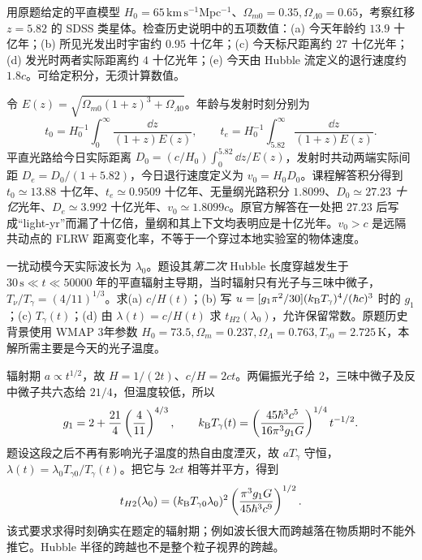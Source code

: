 \begin{exercise}
用原题给定的平直模型 $H_0=65\,\mathrm{km\,s^{-1}Mpc^{-1}}$、$\Omega_{m0}=0.35,\Omega_{\Lambda0}=0.65$，考察红移 $z=5.82$ 的 SDSS 类星体。检查历史说明中的五项数值：(a) 今天年龄约 $13.9$ 十亿年；(b) 所见光发出时宇宙约 $0.95$ 十亿年；(c) 今天标尺距离约 $27$ 十亿光年；(d) 发光时两者实际距离约 $4$ 十亿光年；(e) 今天由 Hubble 流定义的退行速度约 $1.8c$。可给定积分，无须计算数值。
\end{exercise}
\begin{solution}
令 $E(z)=\sqrt{\Omega_{m0}(1+z)^3+\Omega_{\Lambda0}}$。年龄与发射时刻分别为
\[
t_0=H_0^{-1}\int_0^\infty\frac{\dd z}{(1+z)E(z)},\qquad
t_e=H_0^{-1}\int_{5.82}^\infty\frac{\dd z}{(1+z)E(z)}.
\]
平直光路给今日实际距离 $D_0=(c/H_0)\int_0^{5.82}\dd z/E(z)$，发射时共动两端实际间距 $D_e=D_0/(1+5.82)$，今日退行速度定义为 $v_0=H_0D_0$。课程解答积分得到 $t_0\simeq13.88$ 十亿年、$t_e\simeq0.9509$ 十亿年、无量纲光路积分 $1.8099$、$D_0\simeq27.23$ \emph{十亿}光年、$D_e\simeq3.992$ 十亿光年、$v_0\simeq1.8099c$。原官方解答在一处把 $27.23$ 后写成“light-yr”而漏了十亿倍，量纲和其上下文均表明应是十亿光年。$v_0>c$ 是远隔共动点的 FLRW 距离变化率，不等于一个穿过本地实验室的物体速度。
\end{solution}

\begin{exercise}
一扰动模今天实际波长为 $\lambda_0$。题设其\emph{第二次} Hubble 长度穿越发生于 $30\,\mathrm s\ll t\ll50000$ 年的平直辐射主导期，当时辐射只有光子与三味中微子，$T_\nu/T_\gamma=(4/11)^{1/3}$。求(a) $c/H(t)$；(b) 写 $u=[g_1\pi^2/30](k_{\mathrm B} T_\gamma)^4/(\hbar c)^3$ 时的 $g_1$；(c) $T_\gamma(t)$；(d) 由 $\lambda(t)=c/H(t)$ 求 $t_{H2}(\lambda_0)$，允许保留常数。原题历史背景使用 WMAP 3年参数 $H_0=73.5,\Omega_m=0.237,\Omega_\Lambda=0.763,T_{\gamma0}=2.725\,\mathrm K$，本解所需主要是今天的光子温度。
\end{exercise}
\begin{solution}
辐射期 $a\propto t^{1/2}$，故 $H=1/(2t)$、$c/H=2ct$。两偏振光子给 $2$，三味中微子及反中微子共六态给 $21/4$，但温度较低，所以
\[
g_1=2+\frac{21}{4}\left(\frac4{11}\right)^{4/3},\qquad
k_{\mathrm B} T_\gamma(t)=\left(\frac{45\hbar^3c^5}{16\pi^3g_1G}\right)^{1/4}t^{-1/2}.
\]
题设这段之后不再有影响光子温度的热自由度湮灭，故 $aT_\gamma$ 守恒，$\lambda(t)=\lambda_0T_{\gamma0}/T_\gamma(t)$。把它与 $2ct$ 相等并平方，得到
\[
t_{H2}(\lambda_0)
=(k_{\mathrm B} T_{\gamma0}\lambda_0)^2
\left(\frac{\pi^3g_1G}{45\hbar^3c^9}\right)^{1/2}.
\]
该式要求求得时刻确实在题定的辐射期；例如波长很大而跨越落在物质期时不能外推它。Hubble 半径的跨越也不是整个粒子视界的跨越。
\end{solution}

